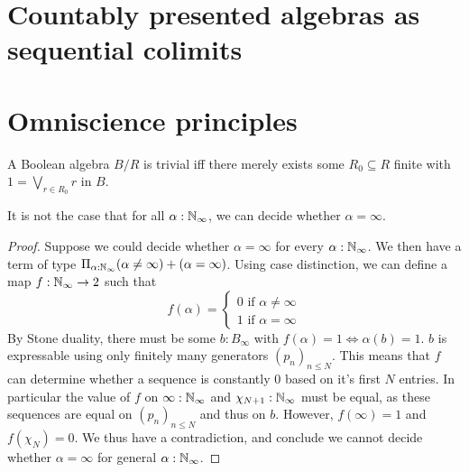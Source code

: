 \documentclass{../util/zariski-small}
\begin{document}
\section{Countably presented algebras as sequential colimits}


\section{Omniscience principles}
\begin{remark}\label{rmkTrivialBA}
  A Boolean algebra $B / R$ 
  is trivial iff there merely exists some $R_0\subseteq R$ finite with 
  $1 = \bigvee_{r \in R_0} r$ in $B$.
\end{remark}

\begin{theorem}
  It is not the case that for all $\alpha:\mathbb{N}_{\infty}$, we can decide whether $\alpha=\infty$.
\end{theorem}
\begin{proof}
  Suppose we could decide whether $\alpha = \infty$ for every $\alpha:\mathbb{N}_{\infty}$. We then have a term of type 
  $\Pi_{\alpha:\mathbb{N}_{\infty}} (\alpha \neq \infty) + (\alpha = \infty)$. 
  Using case distinction, we can define a map $f:\mathbb{N}_{\infty} \to 2$ such that 
  \begin{equation}
    f(\alpha) = \begin{cases} 0 \text{ if } \alpha \neq  \infty
    \\ 1 \text{ if } \alpha = \infty \end{cases} 
  \end{equation}
  By Stone duality, there must be some $b:B_\infty$ with 
  $f(\alpha) = 1 \iff \alpha(b) = 1$.
  $b$ is expressable using only finitely many generators $(p_n)_{n\leq N}$. 
  This means that $f$ can determine whether a sequence is constantly $0$ based on it's first $N$ entries. 
  In particular the value of $f$ on $\infty:\mathbb{N}_{\infty}$ and $\chi_{N+1}:\mathbb{N}_{\infty}$ must be equal, 
  as these sequences are equal on $(p_n)_{n\leq N}$ and thus on $b$. 
  However, $f(\infty) = 1$ and $f(\chi_N) = 0$. 
  We thus have a contradiction, and conclude we cannot decide whether $\alpha = \infty$ for general $\alpha:\mathbb{N}_{\infty}$. 
\end{proof}
\end{document}

